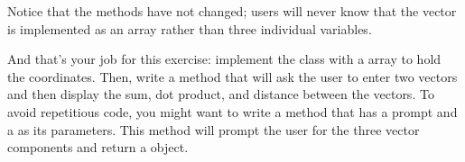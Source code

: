 \begin{exercise}
Notice that the  methods have not changed; users will never know that the vector is implemented as an array rather than three individual variables.

And that's your job for this exercise: implement the  class with a  array to hold the coordinates. Then, write a  method that will ask the user to enter two vectors and then display the sum, dot product, and distance between the vectors. To avoid repetitious code, you might want to write a  method that has a prompt and a  as its parameters. This method will prompt the user for the three vector components and return a  object. 

\end{exercise}
